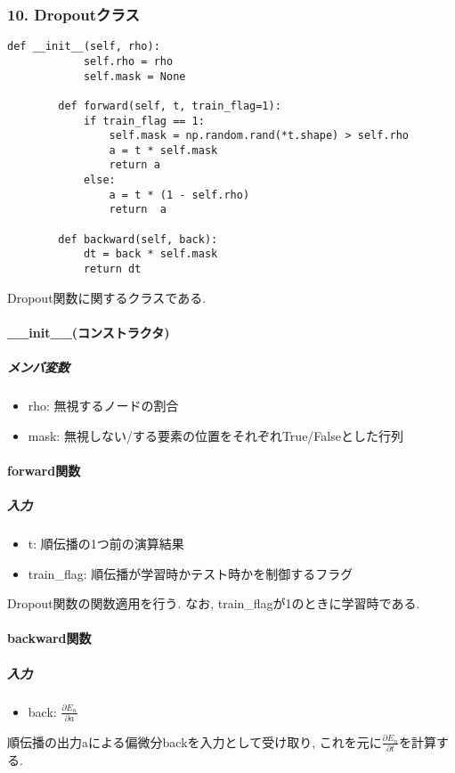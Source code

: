 \documentclass[a4j, titlepage]{jarticle}
\begin{document}
    \subsubsection*{10. Dropoutクラス}
        \begin{lstlisting}[caption=Dropout関数の計算 ,label=fuga]
        def __init__(self, rho):
            self.rho = rho
            self.mask = None

        def forward(self, t, train_flag=1):
            if train_flag == 1:
                self.mask = np.random.rand(*t.shape) > self.rho
                a = t * self.mask
                return a
            else:
                a = t * (1 - self.rho)
                return  a

        def backward(self, back):
            dt = back * self.mask
            return dt
        \end{lstlisting}
        Dropout関数に関するクラスである.
        \paragraph*{\_\_init\_\_(コンストラクタ)}
            \subparagraph*{メンバ変数}
            \begin{itemize}
                \item rho: 無視するノードの割合
                \item mask: 無視しない/する要素の位置をそれぞれTrue/Falseとした行列
            \end{itemize}
        \paragraph*{forward関数}
            \subparagraph*{入力}
            \begin{itemize}
                \item t: 順伝播の1つ前の演算結果
                \item train\_flag: 順伝播が学習時かテスト時かを制御するフラグ
            \end{itemize}
            Dropout関数の関数適用を行う.
            なお, train\_flagが1のときに学習時である.
        \paragraph*{backward関数}
            \subparagraph*{入力}
            \begin{itemize}
                \item back: \(\displaystyle \frac{\partial E_n}{\partial a}\)
            \end{itemize}
            順伝播の出力aによる偏微分backを入力として受け取り, これを元に\(\displaystyle \frac{\partial E_n}{\partial t}\)を計算する.
\end{document}
